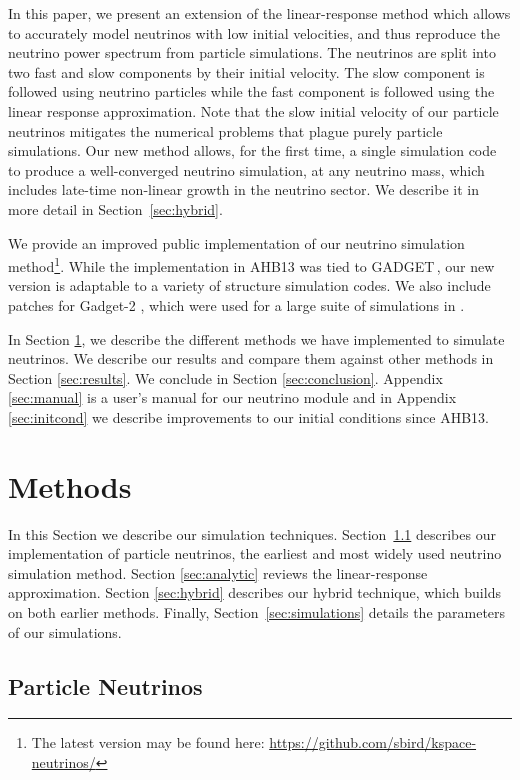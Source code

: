 \documentclass[useAMS, usenatbib]{mnras}
\newcommand{\gadget}{{\small GADGET\,}}
\begin{document}
In this paper, we present an extension of the linear-response method which allows to accurately model neutrinos with low initial velocities, and thus reproduce the neutrino power spectrum from particle simulations. The neutrinos are split into two fast and slow components by their initial velocity. The slow component is followed using neutrino particles while the fast component is followed using the linear response approximation.  Note that the slow initial velocity of our particle neutrinos mitigates the numerical problems that plague purely particle simulations. Our new method allows, for the first time, a single simulation code to produce a well-converged neutrino simulation, at any neutrino mass, which includes late-time non-linear growth in the neutrino sector. We describe it in more detail in Section~\ref{sec:hybrid}.

We provide an improved public implementation of our neutrino simulation
method\footnote{The latest version may be found here: \url{https://github.com/sbird/kspace-neutrinos/}}.
While the implementation in AHB13 was tied to \gadget \citep{Springel_2005}, our new version is adaptable to a variety of structure simulation codes. We also include patches for Gadget-2 \citep{Springel_2005}, which were used for a large suite of simulations in \cite{Liu_2017}.

In Section \ref{sec:methods}, we describe the different methods we have implemented to simulate neutrinos. We describe our
results and compare them against other methods in Section \ref{sec:results}. We conclude in Section \ref{sec:conclusion}. Appendix \ref{sec:manual} is a user's manual for our neutrino module and in Appendix \ref{sec:initcond} we describe improvements to our initial conditions since AHB13.

\section{Methods}
\label{sec:methods}

In this Section we describe our simulation techniques. Section~\ref{sec:particle} describes our implementation of particle neutrinos, the earliest and most widely used neutrino simulation method. Section \ref{sec:analytic} reviews the linear-response approximation. Section \ref{sec:hybrid} describes our hybrid technique, which builds on both earlier methods. Finally, Section~\ref{sec:simulations} details the parameters of our simulations.

\subsection{Particle Neutrinos}
\label{sec:particle}
\end{document}
